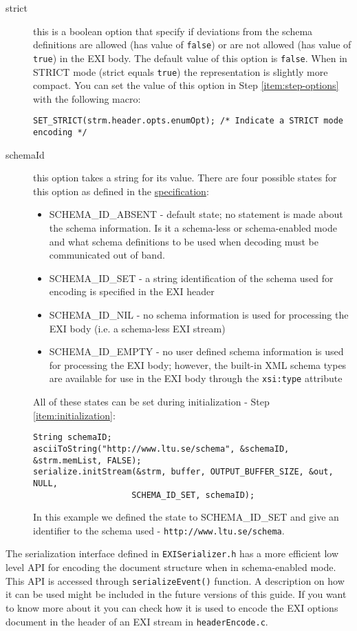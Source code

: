 \begin{description}
 \item[strict] this is a boolean option that specify if deviations from the schema
definitions are allowed (has value of \texttt{false}) or are not allowed (has value of \texttt{true})
in the EXI body. The default value of this option is \texttt{false}. When in STRICT mode
(strict equals \texttt{true}) the representation is slightly more compact. You can set the
value of this option in Step \ref{item:step-options} with the following macro:
\begin{lstlisting}
SET_STRICT(strm.header.opts.enumOpt); /* Indicate a STRICT mode encoding */
\end{lstlisting}

 \item[schemaId] this option takes a string for its value. There are four possible states
for this option as defined in the \href{http://www.w3.org/TR/2011/REC-exi-20110310/#key-schemaIdOption}{specification}:
\begin{itemize}
 \item SCHEMA\_ID\_ABSENT - default state; no statement is made about the schema information.
Is it a schema-less or schema-enabled mode and what schema definitions to be used when decoding must be communicated out of band.
 \item SCHEMA\_ID\_SET - a string identification of the schema used for encoding is specified in the EXI header
 \item SCHEMA\_ID\_NIL - no schema information is used for processing the EXI body (i.e. a schema-less EXI stream)
 \item SCHEMA\_ID\_EMPTY - no user defined schema information is used for processing the EXI body; however, the built-in XML schema types are available for use in the EXI body
through the \texttt{xsi:type} attribute
\end{itemize}
  All of these states can be set during initialization - Step \ref{item:initialization}:
\begin{lstlisting}
String schemaID;
asciiToString("http://www.ltu.se/schema", &schemaID, &strm.memList, FALSE);
serialize.initStream(&strm, buffer, OUTPUT_BUFFER_SIZE, &out, NULL, 
					SCHEMA_ID_SET, schemaID);                           
\end{lstlisting}
In this example we defined the state to SCHEMA\_ID\_SET and give an identifier to the schema used - \texttt{http://www.ltu.se/schema}.
 \end{description}

The serialization interface defined in \texttt{EXISerializer.h} has a more efficient low level API
for encoding the document structure when in schema-enabled mode. This API is accessed through \texttt{serializeEvent()}
function. A description on how it can be used might be included in the future versions of this guide. If you want to know more about it
you can check how it is used to encode the EXI options document in the header of an EXI stream in \texttt{headerEncode.c}. 